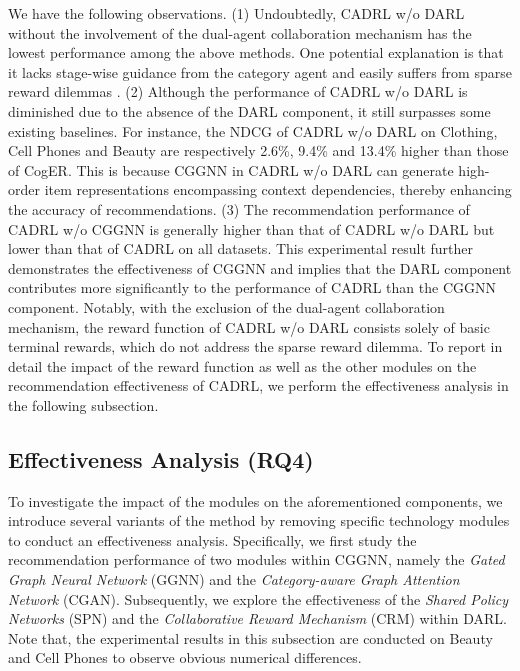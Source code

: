 \documentclass[conference]{IEEEtran}
\begin{document}
We have the following observations. (1) Undoubtedly,  CADRL w/o DARL without the involvement of the dual-agent collaboration mechanism has the lowest performance among the above methods. One potential explanation is that it lacks stage-wise guidance from the category agent and easily suffers from sparse reward dilemmas \cite{MARLsurvey}. 
(2) Although the performance of CADRL w/o DARL is diminished due to the absence of the DARL component, it still surpasses some existing baselines. For instance, the NDCG of CADRL w/o DARL on Clothing, Cell Phones and Beauty are respectively 2.6\%, 9.4\% and 13.4\% higher than those of CogER.  This is because CGGNN in CADRL w/o DARL can generate high-order item representations encompassing context dependencies, thereby enhancing the accuracy of recommendations. (3) The recommendation performance of CADRL w/o CGGNN is generally higher than that of CADRL w/o DARL but lower than that of CADRL on all datasets. This experimental result further demonstrates the effectiveness of CGGNN and implies that  the DARL component contributes more significantly to the performance of CADRL than the CGGNN component. Notably,  with the exclusion of the dual-agent collaboration mechanism, the reward function of CADRL w/o DARL consists solely of basic terminal rewards, which do not address the sparse reward dilemma.  To report in detail the impact of the reward function as well as the other modules on the recommendation effectiveness of CADRL, we perform the effectiveness analysis in the following subsection.






\subsection{Effectiveness Analysis (RQ4)}
To investigate the impact of the modules 
 on the aforementioned components, we introduce several variants of the method by removing specific technology modules to conduct an effectiveness analysis. Specifically, we first study the recommendation performance of two modules within CGGNN, namely the  \emph{Gated Graph Neural Network} (GGNN) and the \emph{Category-aware Graph Attention Network} (CGAN).  Subsequently, we explore the effectiveness of the \emph{Shared Policy Networks} (SPN) and the \emph{Collaborative Reward Mechanism} (CRM) within DARL. Note that, the experimental results in this subsection are conducted on Beauty and Cell Phones to observe obvious numerical differences. 
\end{document}
